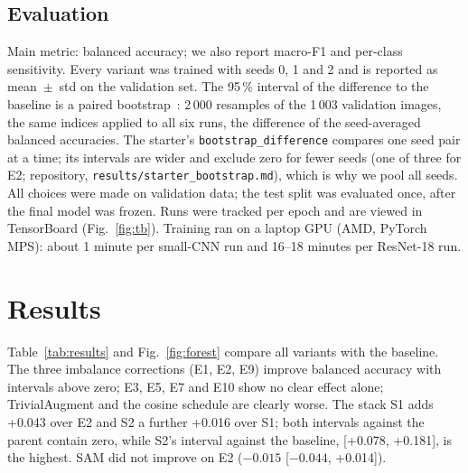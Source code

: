 \documentclass[conference]{IEEEtran}
\begin{document}
\subsection{Evaluation}
Main metric: balanced accuracy; we also report macro-F1 and per-class sensitivity. Every variant was trained
with seeds 0, 1 and 2 and is reported as mean~$\pm$~std on the validation set. The 95\,\% interval of the
difference to the baseline is a paired bootstrap~\cite{efron1993bootstrap}: 2\,000 resamples of the 1\,003
validation images, the same indices applied to all six runs, the difference of the seed-averaged balanced
accuracies. The starter's \texttt{bootstrap\_difference} compares one seed pair at a time; its intervals are
wider and exclude zero for fewer seeds (one of three for E2; repository, \texttt{results/starter\_bootstrap.md}),
which is why we pool all seeds. All choices were made on validation data; the test split
was evaluated once, after the final model was frozen. Runs were tracked per epoch and are viewed in TensorBoard
(Fig.~\ref{fig:tb}). Training ran on a laptop GPU (AMD, PyTorch MPS): about 1 minute per small-CNN run and
16--18 minutes per ResNet-18 run.

\section{Results}
Table~\ref{tab:results} and Fig.~\ref{fig:forest} compare all variants with the baseline. The three imbalance
corrections (E1, E2, E9) improve balanced accuracy with intervals above zero; E3, E5, E7 and E10 show no clear
effect alone; TrivialAugment and the cosine schedule are clearly worse. The stack S1 adds +0.043 over E2 and
S2 a further +0.016 over S1; both intervals against the parent contain zero, while S2's interval against the
baseline, [+0.078, +0.181], is the highest. SAM did not improve on E2 ($-0.015$ [$-0.044$, +0.014]).
\end{document}
